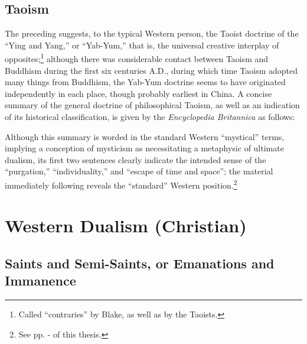 \subsection{Taoism}

The preceding suggests, to the typical Western person,
the Taoist doctrine of the \enquote{Ying and Yang,} or \enquote{Yab-Yum,} that
is, the universal creative interplay of opposites;\footnote{Called \enquote{contraries} by Blake, as well as by the Taoists.}
although there was considerable contact between Taoism and Buddhism
during the first six centuries A.D., during which time Taoism
adopted many things from Buddhism, the Yab-Yum doctrine
seems to have originated independently in each place, though
probably earliest in China. A concise summary of the general
doctrine of philosophical Taoism, as well as an indication
of its historical classification, is given by the \emph{Encyclopedia
Britannica} as follows:


Although this summary is worded in the standard Western \enquote{mystical}
terms, implying a conception of mysticism as necessitating
a metaphysic of ultimate dualism, its first two sentences
clearly indicate the intended sense of the \enquote{purgation,}
\enquote{individuality,} and \enquote{escape of time and space}; the material
immediately following reveals the \enquote{standard} Western position.\footnote{See pp. \pageref{self:04}-\pageref{self:05} of this thesis.}

\label{self:04}

\section{Western Dualism (Christian)}

\subsection{Saints and Semi-Saints, or Emanations and Immanence}

